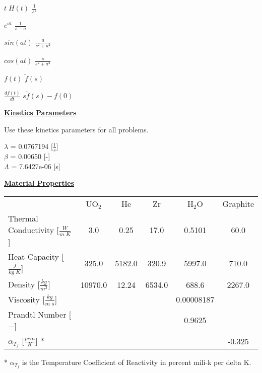 $t\;H(t)$ \hfill $\displaystyle\frac{1}{s^2}$

$e^{at}$ \hfill $\displaystyle\frac{1}{s-a}$

$sin(a t)$ \hfill $\displaystyle\frac{a}{s^2+a^2}$

$cos(a t)$ \hfill $\displaystyle\frac{s}{s^2+a^2}$

$f(t)$ \hfill $\tilde{f}(s)$

$\displaystyle\frac{df(t)}{dt}$ \hfill $s \tilde{f}(s) - f(0)$

\pagebreak
\textbf{\underline{Kinetics Parameters}}

Use these kinetics parameters for all problems.

$\lambda$ = 0.0767194 [$\frac{1}{s}$]\\
$\beta$ = 0.00650 [-] \\
$\Lambda$ = 7.6427e-06 [s]

\textbf{\underline{Material Properties}}

\setlength{\extrarowheight}{2.0pt}
\begin{tabular}{l c c c c c}
& UO$_2$ & He & Zr & H$_2$O & Graphite\\
Thermal Conductivity [$\frac{W}{m\;K}$] & 3.0 		& 0.25 		& 17.0 		& 0.5101 	& 60.0	 \\
Heat Capacity [$\frac{J}{kg\;K}$] 		& 325.0 	& 5182.0 	& 320.9		& 5997.0	& 710.0  \\
Density [$\frac{kg}{m^3}$]				& 10970.0 	& 12.24		& 6534.0	& 688.6		& 2267.0 \\
Viscosity [$\frac{kg}{m\;s}$] 			& 			& 			& 			& 0.00008187& 		 \\
Prandtl Number [$-$] 					& 			& 			& 			& 0.9625	&        \\
$\alpha_{T_f}$ [$\frac{pcm}{K}$] *		& 			&			&			&			& -0.325
\end{tabular}

* $\alpha_{T_f}$ is the Temperature Coefficient of Reactivity in percent mili-k per delta K.

\ifprintanswers
\begin{landscape}
\end{landscape}
\fi

